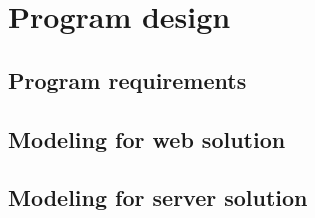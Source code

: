 \chapter{Program design}\label{ch:programDesign}
\section{Program requirements}\label{ch:programRequirements}
\section{Modeling for web solution}\label{ch:modelingWebSolution}
\section{Modeling for server solution}\label{ch:modelingServerSolution}